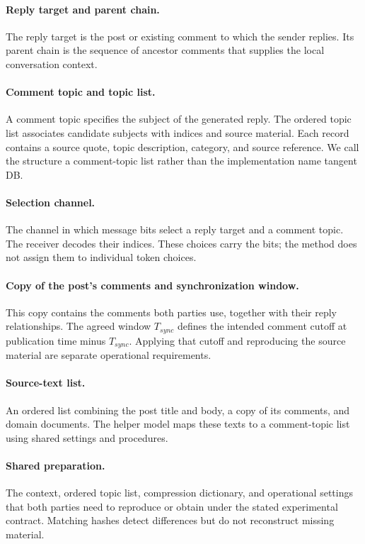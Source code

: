 \paragraph{Reply target and parent chain.}
The reply target is the post or existing comment to which the sender replies. Its parent chain is the sequence of ancestor comments that supplies the local conversation context.

\paragraph{Comment topic and topic list.}
A comment topic specifies the subject of the generated reply. The ordered topic list associates candidate subjects with indices and source material. Each record contains a source quote, topic description, category, and source reference. We call the structure a comment-topic list rather than the implementation name tangent DB.

\paragraph{Selection channel.}
The channel in which message bits select a reply target and a comment topic. The receiver decodes their indices. These choices carry the bits; the method does not assign them to individual token choices.

\paragraph{Copy of the post's comments and synchronization window.}
This copy contains the comments both parties use, together with their reply relationships. The agreed window $T_{sync}$ defines the intended comment cutoff at publication time minus $T_{sync}$. Applying that cutoff and reproducing the source material are separate operational requirements.

\paragraph{Source-text list.}
An ordered list combining the post title and body, a copy of its comments, and domain documents. The helper model maps these texts to a comment-topic list using shared settings and procedures.

\paragraph{Shared preparation.}
The context, ordered topic list, compression dictionary, and operational settings that both parties need to reproduce or obtain under the stated experimental contract. Matching hashes detect differences but do not reconstruct missing material.

